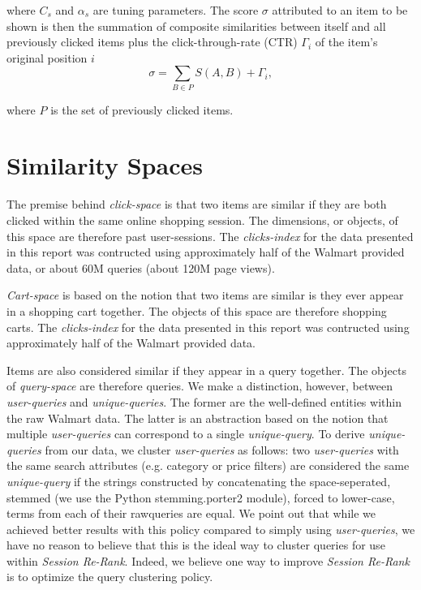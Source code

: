 \documentclass{article}
\begin{document}
where $C_s$ and $\alpha_s$ are tuning parameters. The score $\sigma$ attributed
to an item to be shown is then the summation of composite similarities between
itself and all previously clicked items plus the click-through-rate (CTR)
$\Gamma_i$ of the item's original position $i$
\begin{equation*}
    \sigma = \sum_{B \in P}{S(A, B)} + \Gamma_i,
\end{equation*}

where $P$ is the set of previously clicked items. 

\section{Similarity Spaces}

The premise behind {\em click-space} is that two items are similar if they are
both clicked within the same online shopping session. The dimensions, or
objects, of this space are therefore past user-sessions. The {\em clicks-index}
for the data presented in this report was contructed using approximately half of
the Walmart provided data, or about 60M queries (about 120M page views).

{\em Cart-space} is based on the notion that two items are similar is they ever
appear in a shopping cart together. The objects of this space are therefore
shopping carts. The {\em clicks-index} for the data presented in this report was
contructed using approximately half of the Walmart provided data.

Items are also considered similar if they appear in a query together. The
objects of {\em query-space} are therefore queries. We make a distinction,
however, between {\em user-queries} and {\em unique-queries}. The former are the
well-defined entities within the raw Walmart data. The latter is an abstraction
based on the notion that multiple {\em user-queries} can correspond to a single
{\em unique-query}. To derive {\em unique-queries} from our data, we cluster
{\em user-queries} as follows: two {\em user-queries} with the same search
attributes (e.g. category or price filters) are considered the same {\em
unique-query} if the strings constructed by concatenating the space-seperated,
stemmed (we use the Python stemming.porter2 module), forced to lower-case, terms
from each of their rawqueries are equal. We point out that while we achieved
better results with this policy compared to simply using {\em user-queries}, we
have no reason to believe that this is the ideal way to cluster queries for use
within {\em Session Re-Rank}. Indeed, we believe one way to improve {\em Session
Re-Rank} is to optimize the query clustering policy.
\end{document}
